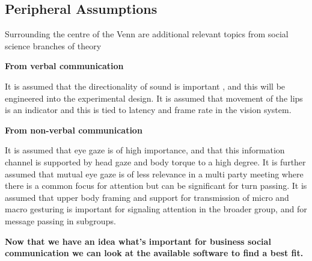 \subsection{Peripheral Assumptions}
                Surrounding the centre of the Venn are additional relevant topics from social science branches of theory\par
                \textbf{From verbal communication}\par
                It is assumed that the directionality of sound is important \cite{Aoki2003}, and this will be engineered into the experimental design. It is assumed that movement of the lips is an indicator and this is tied to latency and frame rate in the vision system.\par
                \textbf{From non-verbal communication}\par
                It is assumed that eye gaze is of high importance, and that this information channel is supported by head gaze and body torque to a high degree. It is further assumed that mutual eye gaze is of less relevance in a multi party meeting where there is a common focus for attention but can be significant for turn passing.
                It is assumed that upper body framing and support for transmission of micro and macro gesturing is important for signaling attention in the broader group, and for message passing in subgroups.
            
\textbf{Now that we have an idea what's important for business social communication we can look at the available software to find a best fit.}
